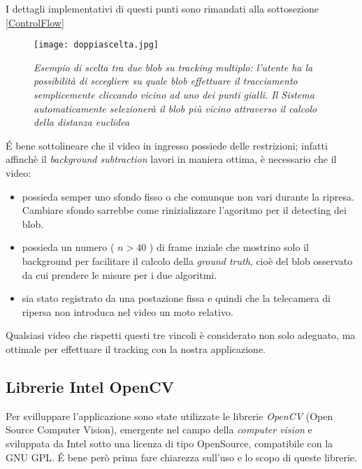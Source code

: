 I dettagli implementativi di questi punti sono rimandati alla sottosezione  \ref{ControlFlow}

\begin{figure}[hb]
\centering
	\texttt{[image: doppiascelta.jpg]}
\caption[Esempio di scelta tra due blob]{\textit{Esempio di scelta tra due blob su tracking multiplo: l'utente ha la possibilità di sccegliere su quale blob effettuare il tracciamento semplicemente cliccando vicino ad uno dei punti gialli. Il Sistema automaticamente selezionerà il blob più vicino attraverso il calcolo della distanza euclidea}\label{fig:scelta2blob}}
\end{figure}


\'E bene sottolineare che il video in ingresso possiede delle restrizioni; infatti affinchè il \textit{background subtraction} lavori in maniera ottima, è necessario che il video:
\begin{itemize}
 \item possieda semper uno sfondo fisso o che comunque non vari durante la ripresa. Cambiare sfondo sarrebbe come rinizializzare l'agoritmo per il detecting dei blob.
\item possieda un numero ( $n > 40 $ ) di frame inziale che mostrino solo il background per facilitare il calcolo della \textit{ground truth}, cioè del blob osservato da cui prendere le misure per i due algoritmi.
\item sia stato registrato da una postazione fissa e quindi che la telecamera di ripersa non introduca nel video un moto relativo.
 \end{itemize}

Qualsiasi video che rispetti questi tre vincoli è considerato non solo adeguato, ma ottimale per effettuare il tracking con la nostra applicazione.







\subsection{Librerie Intel OpenCV}
Per svilluppare l'applicazione sono state utilizzate le librerie \textit{OpenCV} (Open Source Computer Vision), emergente nel campo della \textit{computer vision}  e sviluppata da Intel sotto una licenza di tipo OpenSource, compatibile con la GNU GPL.
\'E bene però prima fare chiarezza sull'uso e lo scopo di queste librerie.\\

